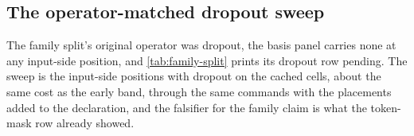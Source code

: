 \documentclass[../main.tex]{subfiles}
\begin{document}
\subsection{The operator-matched dropout sweep}

The family split's original operator was dropout, the basis panel carries none at any input-side position, and \cref{tab:family-split} prints its dropout row pending. The sweep is the input-side positions with dropout on the cached cells, about the same cost as the early band, through the same commands with the placements added to the declaration, and the falsifier for the family claim is what the token-mask row already showed.
\end{document}
